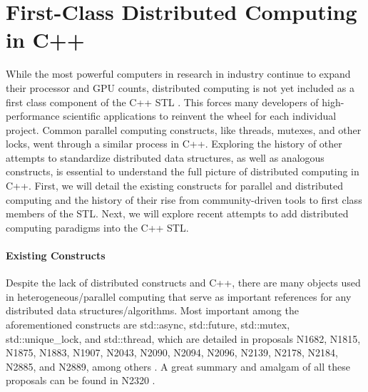 \section{First-Class Distributed Computing in C++} \label{first_class_dist_cpp}
While the most powerful computers in research in industry continue to expand their processor and GPU counts,
distributed computing is not yet included as a first class component of the C++ STL \cite{towards_dist_cpp}. This forces many developers of high-performance scientific applications to reinvent the wheel for each individual project.  Common parallel computing constructs, like threads, mutexes, and other locks, went through a similar process in C++. Exploring the history of other attempts to standardize distributed data structures, as well as analogous constructs, is essential to understand the full picture of distributed computing in C++. First, we will detail the existing constructs for parallel and distributed computing and the history of their rise from community-driven tools to first class members of the STL. Next, we will explore recent attempts to add distributed computing paradigms into the C++ STL. 
\paragraph{Existing Constructs}
Despite the lack of distributed constructs and C++, there are many objects used in heterogeneous/parallel computing that serve as important references for any distributed data structures/algorithms. Most important among the aforementioned constructs are std::async, std::future, std::mutex, std::unique\_lock, and std::thread, which are detailed in proposals N1682, N1815, N1875, N1883, N1907, N2043, N2090, N2094,  N2096, N2139, N2178, N2184, N2885, and N2889, among others  \cite{n1682} \cite{n1815} \cite{n1875} \cite{n1883} \cite{n1907} \cite{n2043} \cite{n2096} \cite{n2139} \cite{n2178} \cite{n2184} \cite{n2285} \cite{n2889}. A great summary and amalgam of all these proposals can be found in N2320 \cite{n2320}. 

